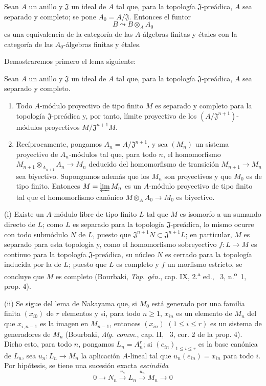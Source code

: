 \begin{proposition}[18.3.2]
\label{IV.18.3.2}
Sean $A$ un anillo y $\mathfrak J$ un ideal de $A$ tal que, para la topología $\mathfrak J$-preádica, $A$ sea separado y completo; se pone $A_0=A/\mathfrak J$. Entonces el funtor
\[
  B\leadsto B\otimes_A A_0
\]
es una equivalencia de la categoría de las $A$-álgebras finitas y étales con la categoría de las $A_0$-álgebras finitas y étales.
\end{proposition}

Demostraremos primero el lema siguiente:

\begin{lemma}[18.3.2.1]
\label{IV.18.3.2.1}
Sean $A$ un anillo y $\mathfrak J$ un ideal de $A$ tal que, para la topología $\mathfrak J$-preádica, $A$ sea separado y completo.
\begin{enumerate}
  \item[\textup{(i)}] Todo $A$-módulo proyectivo de tipo finito $M$ es separado y completo para la topología $\mathfrak J$-preádica y, por tanto, límite proyectivo de los $(A/\mathfrak J^{n+1})$-módulos proyectivos $M/\mathfrak J^{n+1}M$.
  \item[\textup{(ii)}] Recíprocamente, pongamos $A_n=A/\mathfrak J^{n+1}$, y sea $(M_n)$ un sistema proyectivo de $A_n$-módulos tal que, para todo $n$, el homomorfismo $M_{n+1}\otimes_{A_{n+1}}A_n\to M_n$ deducido del homomorfismo de transición $M_{n+1}\to M_n$ sea biyectivo. Supongamos además que los $M_n$ son proyectivos y que $M_0$ es de tipo finito. Entonces $M=\varprojlim M_n$ es un $A$-módulo proyectivo de tipo finito tal que el homomorfismo canónico $M\otimes_A A_0\to M_0$ es biyectivo.
\end{enumerate}
\end{lemma}

(i) Existe un $A$-módulo libre de tipo finito $L$ tal que $M$ es isomorfo a un sumando directo de $L$; como $L$ es separado para la topología $\mathfrak J$-preádica, lo mismo ocurre con todo submódulo $N$ de $L$, puesto que $\mathfrak J^{n+1}N\subset\mathfrak J^{n+1}L$; en particular, $M$ es separado para esta topología y, como el homomorfismo sobreyectivo $f:L\to M$ es continuo para la topología $\mathfrak J$-preádica, su núcleo $N$ es cerrado para la topología inducida por la de $L$; puesto que $L$ es completo y $f$ un morfismo estricto, se concluye que $M$ es completo (Bourbaki, \emph{Top. gén.}, cap. IX, 2.\textsuperscript{a} ed., \textsection~3, n.\textsuperscript{o}~1, prop. 4).

(ii) Se sigue del lema de Nakayama que, si $M_0$ está generado por una familia finita $(x_{i0})$ de $r$ elementos y si, para todo $n\geq 1$, $x_{in}$ es un elemento de $M_n$ del que $x_{i,n-1}$ es la imagen en $M_{n-1}$, entonces $(x_{in})$ $(1\leq i\leq r)$ es un sistema de generadores de $M_n$ (Bourbaki, \emph{Alg. comm.}, cap. II, \textsection~3, cor. 2 de la prop. 4). Dicho esto, para todo $n$, pongamos $L_n=A_n^r$; si $(e_{in})_{1\leq i\leq r}$ es la base canónica de $L_n$, sea $u_n:L_n\to M_n$ la aplicación $A$-lineal tal que $u_n(e_{in})=x_{in}$ para todo $i$. Por hipótesis, se tiene una sucesión exacta \emph{escindida}
\[
  0\longrightarrow N_n\xrightarrow{v_n}L_n\xrightarrow{u_n}M_n\longrightarrow 0
\]

